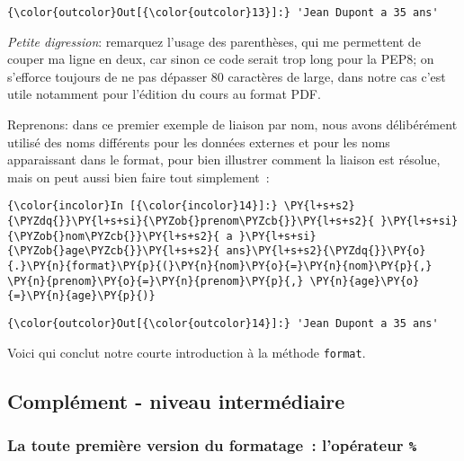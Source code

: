 \begin{Verbatim}[commandchars=\\\{\}]
{\color{outcolor}Out[{\color{outcolor}13}]:} 'Jean Dupont a 35 ans'
\end{Verbatim}
            
    \emph{Petite digression}: remarquez l'usage des parenthèses, qui me
permettent de couper ma ligne en deux, car sinon ce code serait trop
long pour la PEP8; on s'efforce toujours de ne pas dépasser 80
caractères de large, dans notre cas c'est utile notamment pour l'édition
du cours au format PDF.

    Reprenons: dans ce premier exemple de liaison par nom, nous avons
délibérément utilisé des noms différents pour les données externes et
pour les noms apparaissant dans le format, pour bien illustrer comment
la liaison est résolue, mais on peut aussi bien faire tout simplement~:

    \begin{Verbatim}[commandchars=\\\{\}]
{\color{incolor}In [{\color{incolor}14}]:} \PY{l+s+s2}{\PYZdq{}}\PY{l+s+si}{\PYZob{}prenom\PYZcb{}}\PY{l+s+s2}{ }\PY{l+s+si}{\PYZob{}nom\PYZcb{}}\PY{l+s+s2}{ a }\PY{l+s+si}{\PYZob{}age\PYZcb{}}\PY{l+s+s2}{ ans}\PY{l+s+s2}{\PYZdq{}}\PY{o}{.}\PY{n}{format}\PY{p}{(}\PY{n}{nom}\PY{o}{=}\PY{n}{nom}\PY{p}{,} \PY{n}{prenom}\PY{o}{=}\PY{n}{prenom}\PY{p}{,} \PY{n}{age}\PY{o}{=}\PY{n}{age}\PY{p}{)}
\end{Verbatim}


\begin{Verbatim}[commandchars=\\\{\}]
{\color{outcolor}Out[{\color{outcolor}14}]:} 'Jean Dupont a 35 ans'
\end{Verbatim}
            
    Voici qui conclut notre courte introduction à la méthode
\texttt{format}.

    \hypertarget{compluxe9ment---niveau-intermuxe9diaire}{%
\subsection{Complément - niveau
intermédiaire}\label{compluxe9ment---niveau-intermuxe9diaire}}

    \hypertarget{la-toute-premiuxe8re-version-du-formatage-lopuxe9rateur}{%
\subsubsection{\texorpdfstring{La toute première version du formatage~:
l'opérateur
\texttt{\%}}{La toute première version du formatage~: l'opérateur \%}}\label{la-toute-premiuxe8re-version-du-formatage-lopuxe9rateur}}

